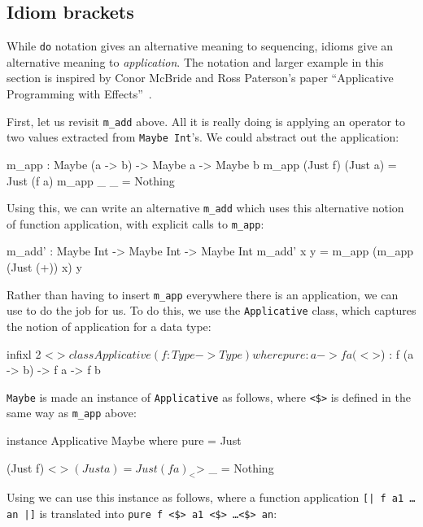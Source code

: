 \subsection{Idiom brackets}

While \texttt{do} notation gives an alternative meaning to sequencing, idioms give an alternative meaning to \emph{application}.
The notation and larger example in this section is inspired by Conor McBride and Ross Paterson's paper ``Applicative
Programming with Effects''~\cite{idioms}.

First, let us revisit \texttt{m\_add} above. All it is really doing is applying an operator to two values extracted from \texttt{Maybe Int}'s.
We could abstract out the application:

\begin{code}
m_app : Maybe (a -> b) -> Maybe a -> Maybe b
m_app (Just f) (Just a) = Just (f a)
m_app _        _        = Nothing
\end{code} 

\noindent
Using this, we can write an alternative \texttt{m\_add} which uses this alternative notion of function application, with explicit calls to \texttt{m\_app}:

\begin{code}
m_add' : Maybe Int -> Maybe Int -> Maybe Int
m_add' x y = m_app (m_app (Just (+)) x) y
\end{code} 

\noindent
Rather than having to insert \texttt{m\_app} everywhere there is an application, we can use  to do the job for us.
To do this, we use the \texttt{Applicative} class, which captures the notion of application for a data type:

\begin{code}
infixl 2 <$> 

class Applicative (f : Type -> Type) where 
    pure  : a -> f a
    (<$>) : f (a -> b) -> f a -> f b 
\end{code} 

\noindent
\texttt{Maybe} is made an instance of \texttt{Applicative} as follows, where \texttt{<\$>} is defined in the same way as \texttt{m\_app} above:

\begin{code}
instance Applicative Maybe where
    pure = Just

    (Just f) <$> (Just a) = Just (f a)
    _        <$> _        = Nothing
\end{code} 

\noindent
Using  we can use this instance as follows, where a function application \texttt{[| f a1 \dots an |]} is translated into \texttt{pure f <\$> a1 <\$> \dots <\$> an}:

